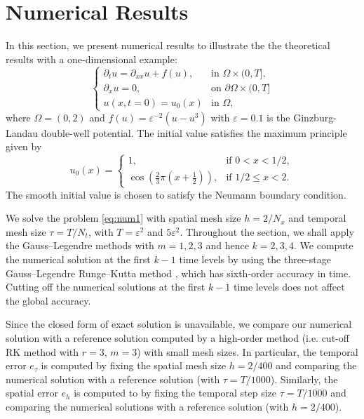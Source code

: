 \documentclass[10pt,final,leqno,onefignum,onetabnum]{siamltex}%
\def\leq{\leqslant}
\def\l{\left}
\def\r{\right}
\def\epsilon{\varepsilon}
\begin{document}
\section{Numerical Results}\label{sec:numerics}
In this section, we present numerical results to illustrate the the theoretical results
with a one-dimensional example:
\begin{equation}\label{eq:num1}
\begin{cases}
  \partial_t u = \partial_{xx}u + f(u), & \mbox{in } \Omega \times(0,T], \\
  \partial_x u = 0, & \mbox{on } \partial\Omega \times(0,T] \\
  u(x,t=0) = u_0(x) & \mbox{in } \Omega,
\end{cases}
\end{equation}
where  $\Omega = (0,2)$ and $f(u) = \epsilon^{-2}(u-u^3)$ with $\epsilon=0.1$ is
the Ginzburg-Landau double-well potential.
The initial value satisfies the maximum principle given by
\begin{equation}\label{eq:num1_init}
u_0(x) = \begin{cases}
           1, & \mbox{if } 0<x<1/2, \\
           \cos\l(\frac23\pi\l(x+\frac12\r)\r), & \mbox{if }  1/2\leq x<2.
         \end{cases}
\end{equation}
The smooth initial value is chosen to satisfy the Neumann boundary condition.

We solve the problem \eqref{eq:num1} with spatial mesh size $h = 2/N_x$
and temporal mesh size $\tau = T / N_t$, with $T=\epsilon^2$ and $5\epsilon^2$.
Throughout the section, we shall apply the Gauss--Legendre methods with $m=1,2,3$ and hence $k=2,3,4$.
We compute the numerical solution at the first $k -1$ time levels by using the three-stage
Gauss--Legendre Runge--Kutta method \cite[Table 5.2]{HairerWanner:2010}, which has sixth-order accuracy in time.
Cutting off the numerical solutions at the first $k - 1$ time levels does not affect the global accuracy.



Since the closed form of exact solution is
unavailable, we compare our numerical solution with a reference solution computed by a
high-order method (i.e. cut-off RK method with $r=3$, $m=3$) with small mesh sizes.
In particular, the temporal error $e_\tau$
is computed by fixing the spatial mesh size $h = 2/400$
and comparing the numerical solution with
a reference solution (with $\tau = T/1000$).
Similarly, the spatial error $e_h$
is computed to by fixing the temporal step size
$\tau = T/1000$ and comparing the numerical solutions with
a reference solution (with  $h = 2/400$).
\end{document}
